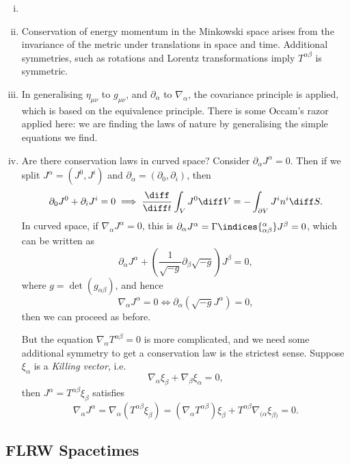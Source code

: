 \documentclass[12pt]{article}
\begin{document}
\begin{remark}
	\begin{enumerate}[(i)]
		\item[]
		\item Conservation of energy momentum in the Minkowski space arises from the invariance of the metric under translations in space and time. Additional symmetries, such as rotations and Lorentz transformations imply $T^{\alpha\beta}$ is symmetric.
		\item In generalising $\eta_{\mu\nu}$ to $g_{\mu\nu}$, and $\partial_\alpha$ to $\nabla_\alpha$, the covariance principle is applied, which is based on the equivalence principle. There is some Occam's razor applied here: we are finding the laws of nature by generalising the simple equations we find.
		\item Are there conservation laws in curved space? Consider $\partial_\alpha J^\alpha = 0$. Then if we split $J^\alpha = (J^0, J^i)$ and $\partial_\alpha = (\partial_0, \partial_{i})$, then
			\[
			\partial_0 J^0 + \partial_i J^i = 0 \implies \frac{\diff}{\diff t} \int_V J^0 \diff V = - \int_{\partial V} J^i n^i \diff S.
			\]
			In curved space, if $\nabla_\alpha J^\alpha = 0$, this is $\partial_\alpha J^\alpha = \Gamma\indices{^{\alpha}_{\alpha\beta}} J^\beta = 0$, which can be written as
			\[
				\partial_\alpha J^\alpha + \left( \frac{1}{\sqrt{-g}} \partial_\beta \sqrt{-g} \right) J^\beta = 0,
			\]
			where $g = \det(g_{\alpha\beta})$, and hence 
			\[
				\nabla_\alpha J^\alpha = 0 \iff \partial_\alpha (\sqrt{-g} J^\alpha) = 0,
			\]
			then we can proceed as before.

			But the equation $\nabla_\alpha T^{\alpha\beta} = 0$ is more complicated, and we need some additional symmetry to get a conservation law is the strictest sense. Suppose $\xi_\alpha$ is a \emph{Killing vector}, i.e.
			\[
			\nabla_\alpha \xi_\beta + \nabla_\beta \xi_\alpha = 0,
			\]
			then $J^\alpha = T^{\alpha\beta} \xi_\beta$ satisfies
			\[
			\nabla_\alpha J^\alpha = \nabla_\alpha (T^{\alpha\beta} \xi_\beta) = (\nabla_\alpha T^{\alpha\beta}) \xi_\beta + T^{\alpha\beta} \nabla_{(\alpha} \xi_{\beta)} = 0.
			\]
	\end{enumerate}
\end{remark}

\subsection{FLRW Spacetimes}
\label{sub:flrw}
\end{document}
